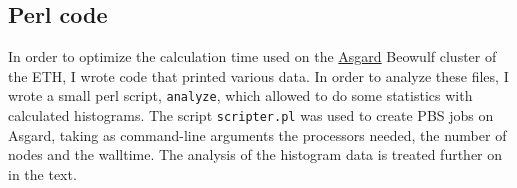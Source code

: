 \subsection{Perl code}
In order to optimize the calculation time used on the \href{http://www.asgard.ethz.ch}{Asgard} Beowulf cluster of the ETH, I wrote code that printed various data. In
order to analyze these files, I wrote a small perl script, \texttt{analyze}, which allowed to do some statistics with calculated histograms. The script
\texttt{scripter.pl} was used to create PBS jobs on Asgard, taking as command-line arguments the processors needed, the number of nodes and the walltime. The analysis
of the histogram data is treated further on in the text. 



